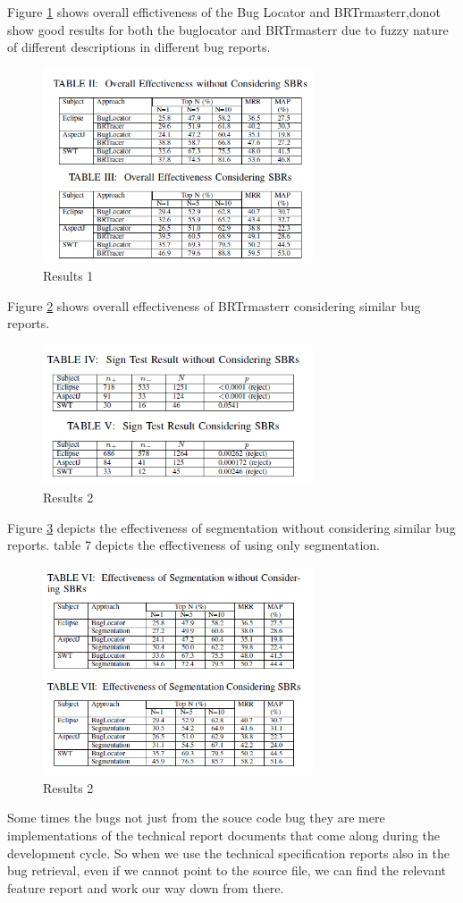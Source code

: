 \documentclass[]{sig-alternate-05-2015}
\begin{document}
 Figure \ref{fig:read611} shows overall effictiveness of the Bug Locator and BRTrmasterr,donot show good results for both the buglocator and BRTrmasterr due to fuzzy nature of different descriptions in different bug reports.
\begin{figure}[h]
\includegraphics[width=8cm]{fig611.png}
\caption{Results 1}
\label{fig:read611}
\end{figure}
Figure \ref{fig:read612} shows overall effectiveness of BRTrmasterr considering similar bug reports.
\begin{figure}[h]
\includegraphics[width=8cm]{fig612.png}
\caption{Results 2}
\label{fig:read612}
\end{figure}

Figure \ref{fig:read613} depicts the effectiveness of segmentation without considering similar bug reports. table 7 depicts the effectiveness of using only segmentation. 
\begin{figure}[h]
\includegraphics[width=8cm]{fig613.png}
\caption{Results 2}
\label{fig:read613}
\end{figure}
Some times the bugs not just from the souce code bug they are mere implementations of the technical report documents that come along during the development cycle. So when we use the technical specification reports also in the bug retrieval, even if we cannot point to the source file, we can find the relevant feature report and work our way down from there. \newline
\end{document}
